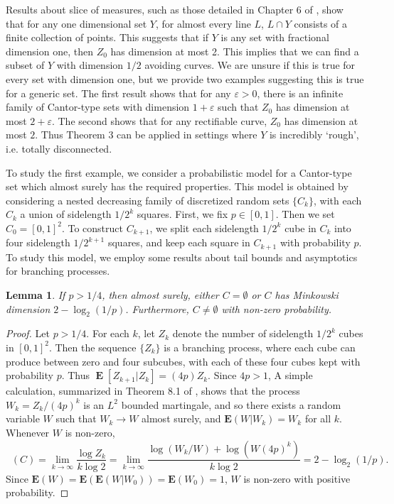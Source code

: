 \documentclass[dvipsnames,letterpaper,12pt]{article}
\numberwithin{equation}{section}
\theoremstyle{plain}
\newtheorem{lemma}{Lemma}
\DeclareMathOperator{\minkdim}{\dim_{\mathbf{M}}}
\DeclareMathOperator{\Expect}{\mathbf{E}}
\begin{document}
Results about slice of measures, such as those detailed in Chapter 6 of \cite{Matilla}, show that for any one dimensional set $Y$, for almost every line $L$, $L \cap Y$ consists of a finite collection of points. This suggests that if $Y$ is any set with fractional dimension one, then $Z_0$ has dimension at most 2. This implies that we can find a subset of $Y$ with dimension $1/2$ avoiding curves. We are unsure if this is true for every set with dimension one, but we provide two examples suggesting this is true for a generic set. The first result shows that for any $\varepsilon > 0$, there is an infinite family of Cantor-type sets with dimension $1 + \varepsilon$ such that $Z_0$ has dimension at most $2 + \varepsilon$. The second shows that for any rectifiable curve, $Z_0$ has dimension at most $2$. Thus Theorem 3 can be applied in settings where $Y$ is incredibly `rough', i.e. totally disconnected.

To study the first example, we consider a probabilistic model for a Cantor-type set which almost surely has the required properties. This model is obtained by considering a nested decreasing family of discretized random sets $\{ C_k \}$, with each $C_k$ a union of sidelength $1/2^k$ squares. First, we fix $p \in [0,1]$. Then we set $C_0 = [0,1]^2$. To construct $C_{k+1}$, we split each sidelength $1/2^k$ cube in $C_k$ into four sidelength $1/2^{k+1}$ squares, and keep each square in $C_{k+1}$ with probability $p$. To study this model, we employ some results about tail bounds and asymptotics for branching processes.

\begin{lemma} \label{randomdimension}
	If $p > 1/4$, then almost surely, either $C = \emptyset$ or $C$ has Minkowski dimension $2 - \log_2(1/p)$. Furthermore, $C \neq \emptyset$ with non-zero probability.
\end{lemma}
\begin{proof}
	Let $p > 1/4$. For each $k$, let $Z_k$ denote the number of sidelength $1/2^k$ cubes in $[0,1]^2$. Then the sequence $\{ Z_k \}$ is a branching process, where each cube can produce between zero and four subcubes, with each of these four cubes kept with probability $p$. Thus $\Expect[Z_{k+1}|Z_k] = (4p) Z_k$. Since $4p > 1$, A simple calculation, summarized in Theorem 8.1 of \cite{Harris}, shows that the process $W_k = Z_k / (4p)^k$ is an $L^2$ bounded martingale, and so there exists a random variable $W$ such that $W_k \to W$ almost surely, and $\mathbf{E}(W|W_k) = W_k$ for all $k$. Whenever $W$ is non-zero,
	\[ \minkdim(C) = \lim_{k \to \infty} \frac{\log Z_k}{k \log 2} = \lim_{k \to \infty} \frac{\log(W_k/W) + \log(W (4p)^k)}{k \log 2} = 2 - \log_2(1/p). \]
	Since $\mathbf{E}(W) = \mathbf{E}(\mathbf{E}(W|W_0)) = \mathbf{E}(W_0) = 1$, $W$ is non-zero with positive probability.
\end{proof}
\end{document}
